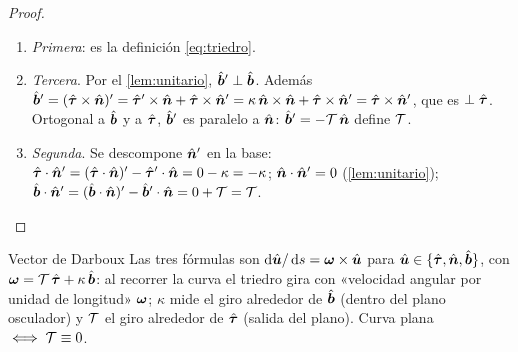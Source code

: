 \begin{proof}
\begin{enumerate}
  \item \emph{Primera}: es la definición \eqref{eq:triedro}.
  \item \emph{Tercera}. Por el \cref{lem:unitario}, $\hat{\bm{b}}'\perp\hat{\bm{b}}$. Además
  $\hat{\bm{b}}'=(\hat{\bm{\tau}}\times\hat{\bm{n}})'=\hat{\bm{\tau}}'\times\hat{\bm{n}}+\hat{\bm{\tau}}\times\hat{\bm{n}}'
  =\kappa\,\hat{\bm{n}}\times\hat{\bm{n}}+\hat{\bm{\tau}}\times\hat{\bm{n}}'=\hat{\bm{\tau}}\times\hat{\bm{n}}'$, que es
  $\perp\hat{\bm{\tau}}$. Ortogonal a $\hat{\bm{b}}$ y a $\hat{\bm{\tau}}$, $\hat{\bm{b}}'$ es paralelo a $\hat{\bm{n}}$:
  $\hat{\bm{b}}'=-\mathcal{T}\,\hat{\bm{n}}$ define $\mathcal{T}$.
  \item \emph{Segunda}. Se descompone $\hat{\bm{n}}'$ en la base:
  $\hat{\bm{\tau}}\cdot\hat{\bm{n}}'=(\hat{\bm{\tau}}\cdot\hat{\bm{n}})'-\hat{\bm{\tau}}'\cdot\hat{\bm{n}}=0-\kappa=-\kappa$;
  $\hat{\bm{n}}\cdot\hat{\bm{n}}'=0$ (\cref{lem:unitario});
  $\hat{\bm{b}}\cdot\hat{\bm{n}}'=(\hat{\bm{b}}\cdot\hat{\bm{n}})'-\hat{\bm{b}}'\cdot\hat{\bm{n}}=0+\mathcal{T}=\mathcal{T}$.\qedhere
\end{enumerate}
\end{proof}

\begin{clave}[violeta]{Vector de Darboux}
Las tres fórmulas son $\mathop{}\!\mathrm{d}\hat{\bm{u}}/\mathop{}\!\mathrm{d} s=\bm{\omega}\times\hat{\bm{u}}$ para
$\hat{\bm{u}}\in\{\hat{\bm{\tau}},\hat{\bm{n}},\hat{\bm{b}}\}$, con
$\bm{\omega}=\mathcal{T}\,\hat{\bm{\tau}}+\kappa\,\hat{\bm{b}}$: al recorrer la curva el triedro gira
con «velocidad angular por unidad de longitud» $\bm{\omega}$; $\kappa$ mide
el giro alrededor de $\hat{\bm{b}}$ (dentro del plano osculador) y $\mathcal{T}$ el giro
alrededor de $\hat{\bm{\tau}}$ (salida del plano). Curva plana $\iff\mathcal{T}\equiv0$.
\end{clave}

